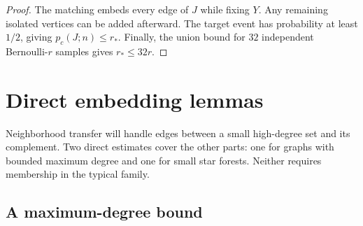 \documentclass[11pt]{article}
\theoremstyle{remark}
\numberwithin{equation}{section}
\begin{document}
\begin{proof}
The matching embeds every edge of $J$ while fixing $Y$.
Any remaining isolated vertices can be added afterward. The
target event has probability at least $1/2$, giving
$p_c(J;n)\leq r_*$. Finally, the union bound for $32$ independent
Bernoulli-$r$ samples gives $r_*\leq32r$.
\end{proof}

\section{Direct embedding lemmas}
\label{sec:direct}

Neighborhood transfer will handle edges between a small
high-degree set and its complement. Two direct estimates cover the other parts:
one for graphs with bounded maximum degree and one for small
star forests. Neither requires membership in the typical family.

\subsection{A maximum-degree bound}
\end{document}
